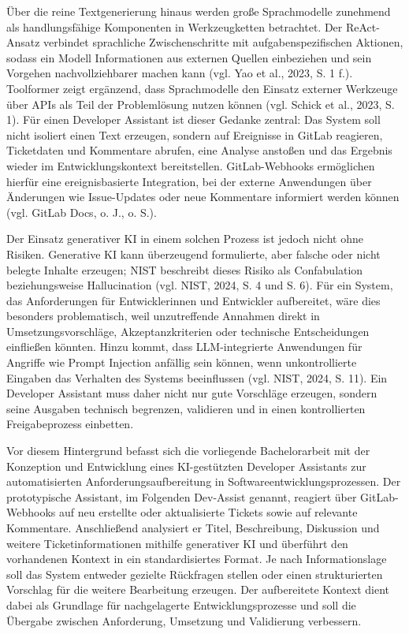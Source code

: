 \documentclass[12pt,a4paper,oneside]{scrreprt}
\begin{document}
Über die reine Textgenerierung hinaus werden große Sprachmodelle zunehmend als handlungsfähige Komponenten in Werkzeugketten betrachtet. Der ReAct-Ansatz verbindet sprachliche Zwischenschritte mit aufgabenspezifischen Aktionen, sodass ein Modell Informationen aus externen Quellen einbeziehen und sein Vorgehen nachvollziehbarer machen kann (vgl. Yao et al., 2023, S. 1 f.). Toolformer zeigt ergänzend, dass Sprachmodelle den Einsatz externer Werkzeuge über APIs als Teil der Problemlösung nutzen können (vgl. Schick et al., 2023, S. 1). Für einen Developer Assistant ist dieser Gedanke zentral: Das System soll nicht isoliert einen Text erzeugen, sondern auf Ereignisse in GitLab reagieren, Ticketdaten und Kommentare abrufen, eine Analyse anstoßen und das Ergebnis wieder im Entwicklungskontext bereitstellen. GitLab-Webhooks ermöglichen hierfür eine ereignisbasierte Integration, bei der externe Anwendungen über Änderungen wie Issue-Updates oder neue Kommentare informiert werden können (vgl. GitLab Docs, o. J., o. S.).

Der Einsatz generativer KI in einem solchen Prozess ist jedoch nicht ohne Risiken. Generative KI kann überzeugend formulierte, aber falsche oder nicht belegte Inhalte erzeugen; NIST beschreibt dieses Risiko als Confabulation beziehungsweise Hallucination (vgl. NIST, 2024, S. 4 und S. 6). Für ein System, das Anforderungen für Entwicklerinnen und Entwickler aufbereitet, wäre dies besonders problematisch, weil unzutreffende Annahmen direkt in Umsetzungsvorschläge, Akzeptanzkriterien oder technische Entscheidungen einfließen könnten. Hinzu kommt, dass LLM-integrierte Anwendungen für Angriffe wie Prompt Injection anfällig sein können, wenn unkontrollierte Eingaben das Verhalten des Systems beeinflussen (vgl. NIST, 2024, S. 11). Ein Developer Assistant muss daher nicht nur gute Vorschläge erzeugen, sondern seine Ausgaben technisch begrenzen, validieren und in einen kontrollierten Freigabeprozess einbetten.

Vor diesem Hintergrund befasst sich die vorliegende Bachelorarbeit mit der Konzeption und Entwicklung eines KI-gestützten Developer Assistants zur automatisierten Anforderungsaufbereitung in Softwareentwicklungsprozessen. Der prototypische Assistant, im Folgenden Dev-Assist genannt, reagiert über GitLab-Webhooks auf neu erstellte oder aktualisierte Tickets sowie auf relevante Kommentare. Anschließend analysiert er Titel, Beschreibung, Diskussion und weitere Ticketinformationen mithilfe generativer KI und überführt den vorhandenen Kontext in ein standardisiertes Format. Je nach Informationslage soll das System entweder gezielte Rückfragen stellen oder einen strukturierten Vorschlag für die weitere Bearbeitung erzeugen. Der aufbereitete Kontext dient dabei als Grundlage für nachgelagerte Entwicklungsprozesse und soll die Übergabe zwischen Anforderung, Umsetzung und Validierung verbessern.
\end{document}
